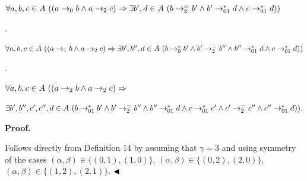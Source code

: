 \documentclass[10pt,a4paper]{amsart}
\begin{document}
$\forall a,b,c\in A\leavevmode\nobreak\ ((a\to_{0}b\wedge a\to_{2}c)\Rightarrow%
\exists b^{\prime},d\in A\leavevmode\nobreak\ (b\to_{2}^{=}b^{\prime}\wedge b^%
{\prime}\to_{01}^{*}d\wedge c\to_{01}^{*}d))$\par
 
 
 
\par{}. 
 
$\forall a,b,c\in A\leavevmode\nobreak\ ((a\to_{1}b\wedge a\to_{2}c)\Rightarrow%
\exists b^{\prime},b^{\prime\prime},d\in A\leavevmode\nobreak\ (b\to_{0}^{*}b^%
{\prime}\wedge b^{\prime}\to_{2}^{=}b^{\prime\prime}\wedge b^{\prime\prime}\to%
_{01}^{*}d\wedge c\to_{01}^{*}d))$\par
 
 
 
\par{}. 
 
$\forall a,b,c\in A\leavevmode\nobreak\ ((a\to_{2}b\wedge a\to_{2}c)\Rightarrow$\par
 
 
 
$\exists b^{\prime},b^{\prime\prime},c^{\prime},c^{\prime\prime},d\in A%
\leavevmode\nobreak\ (b\to_{01}^{*}b^{\prime}\wedge b^{\prime}\to_{2}^{=}b^{%
\prime\prime}\wedge b^{\prime\prime}\to_{01}^{*}d\wedge c\to_{01}^{*}c^{\prime%
}\wedge c^{\prime}\to_{2}^{=}c^{\prime\prime}\wedge c^{\prime\prime}\to_{01}^{%
*}d)).$\par
 
 
  
 
  
 
 
 
 
\par\medskip\noindent\textbf{Proof.}\par
 
 
Follows directly from Definition 14 by assuming that $\gamma=3$ and using symmetry of the cases $(\alpha,\beta)\in\{(0,1),(1,0)\}$, $(\alpha,\beta)\in\{(0,2),(2,0)\}$, $(\alpha,\beta)\in\{(1,2),(2,1)\}$. $\hfill\blacktriangleleft$\par
 
\end{document}

